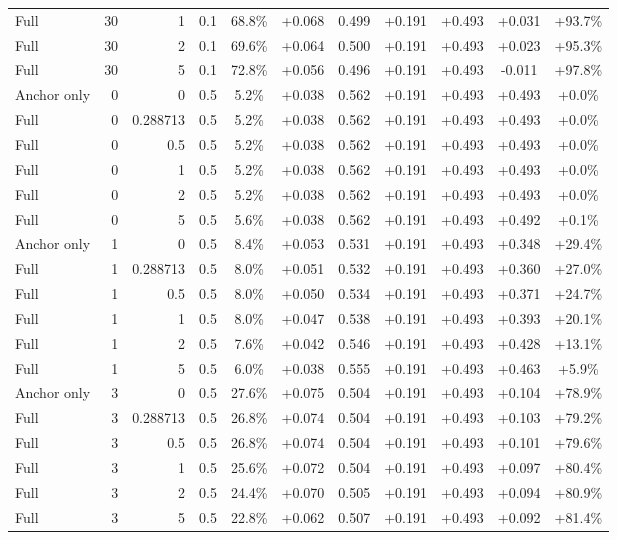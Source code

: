 \begin{table}[htbp]
\begin{tabular}{lrrrccccccc}
Full & 30 & 1 & 0.1 & 68.8\% & +0.068 & 0.499 & +0.191 & +0.493 & +0.031 & +93.7\% \\
Full & 30 & 2 & 0.1 & 69.6\% & +0.064 & 0.500 & +0.191 & +0.493 & +0.023 & +95.3\% \\
Full & 30 & 5 & 0.1 & 72.8\% & +0.056 & 0.496 & +0.191 & +0.493 & -0.011 & +97.8\% \\
Anchor only & 0 & 0 & 0.5 & 5.2\% & +0.038 & 0.562 & +0.191 & +0.493 & +0.493 & +0.0\% \\
Full & 0 & 0.288713 & 0.5 & 5.2\% & +0.038 & 0.562 & +0.191 & +0.493 & +0.493 & +0.0\% \\
Full & 0 & 0.5 & 0.5 & 5.2\% & +0.038 & 0.562 & +0.191 & +0.493 & +0.493 & +0.0\% \\
Full & 0 & 1 & 0.5 & 5.2\% & +0.038 & 0.562 & +0.191 & +0.493 & +0.493 & +0.0\% \\
Full & 0 & 2 & 0.5 & 5.2\% & +0.038 & 0.562 & +0.191 & +0.493 & +0.493 & +0.0\% \\
Full & 0 & 5 & 0.5 & 5.6\% & +0.038 & 0.562 & +0.191 & +0.493 & +0.492 & +0.1\% \\
Anchor only & 1 & 0 & 0.5 & 8.4\% & +0.053 & 0.531 & +0.191 & +0.493 & +0.348 & +29.4\% \\
Full & 1 & 0.288713 & 0.5 & 8.0\% & +0.051 & 0.532 & +0.191 & +0.493 & +0.360 & +27.0\% \\
Full & 1 & 0.5 & 0.5 & 8.0\% & +0.050 & 0.534 & +0.191 & +0.493 & +0.371 & +24.7\% \\
Full & 1 & 1 & 0.5 & 8.0\% & +0.047 & 0.538 & +0.191 & +0.493 & +0.393 & +20.1\% \\
Full & 1 & 2 & 0.5 & 7.6\% & +0.042 & 0.546 & +0.191 & +0.493 & +0.428 & +13.1\% \\
Full & 1 & 5 & 0.5 & 6.0\% & +0.038 & 0.555 & +0.191 & +0.493 & +0.463 & +5.9\% \\
Anchor only & 3 & 0 & 0.5 & 27.6\% & +0.075 & 0.504 & +0.191 & +0.493 & +0.104 & +78.9\% \\
Full & 3 & 0.288713 & 0.5 & 26.8\% & +0.074 & 0.504 & +0.191 & +0.493 & +0.103 & +79.2\% \\
Full & 3 & 0.5 & 0.5 & 26.8\% & +0.074 & 0.504 & +0.191 & +0.493 & +0.101 & +79.6\% \\
Full & 3 & 1 & 0.5 & 25.6\% & +0.072 & 0.504 & +0.191 & +0.493 & +0.097 & +80.4\% \\
Full & 3 & 2 & 0.5 & 24.4\% & +0.070 & 0.505 & +0.191 & +0.493 & +0.094 & +80.9\% \\
Full & 3 & 5 & 0.5 & 22.8\% & +0.062 & 0.507 & +0.191 & +0.493 & +0.092 & +81.4\% \\

\end{tabular}
\end{table}
